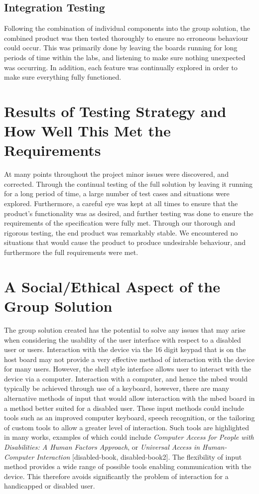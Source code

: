 \subsection*{Integration Testing}

Following the combination of individual components into the group solution, the 
combined product was then tested thoroughly to ensure no erroneous behaviour 
could occur. This was primarily done by leaving the boards running for long 
periods of time within the labs, and listening to make sure nothing unexpected 
was occurring. In addition, each feature was continually explored in order to 
make sure everything fully functioned.  

\section{Results of Testing Strategy and How Well This Met the Requirements}

At many points throughout the project minor issues were discovered, and corrected. 
Through the continual testing of the full solution by leaving it running for a 
long period of time, a large number of test cases and situations were explored.
Furthermore, a careful eye was kept at all times to ensure that the product's
functionality was as desired, and further testing was done to ensure the 
requirements of the specification were fully met.
Through our thorough and rigorous testing, the end product was remarkably stable. 
We encountered no situations that would cause the product to produce undesirable 
behaviour, and furthermore the full requirements were met.

\section{A Social/Ethical Aspect of the Group Solution} 

The group solution created has the potential to solve any issues that may arise 
when considering the usability of the user interface with respect to a disabled 
user or users. Interaction with the device via the 16 digit keypad that is on 
the host board may not provide a very effective method of interaction with the 
device for many users. However, the shell style interface allows user to interact 
with the device via a computer. Interaction with a computer, and hence the mbed 
would typically be achieved through use of a keyboard, however, there are many 
alternative methods of input that would allow interaction with the mbed board in 
a method better suited for a disabled user. These input methods could include 
tools such as an improved computer keyboard, speech recognition, or the tailoring 
of custom tools to allow a greater level of interaction. Such tools are 
highlighted in many works, examples of which could include \textit{Computer Access for People with 
Disabilities: A Human Factors Approach}, or \textit{Universal Access in 
Human-Computer Interaction} [disabled-book, disabled-book2]. The flexibility of 
input method provides a wide range of possible tools enabling communication with 
the device. This therefore avoids significantly the problem of interaction for 
a handicapped or disabled user. 
